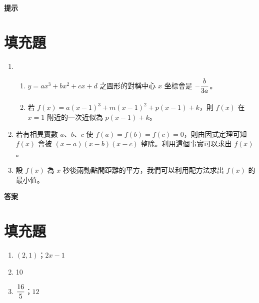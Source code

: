 \documentclass[10pt]{article}
\newcommand*{\fraction}[2]{\rule[-.8\baselineskip]{0pt}{2\baselineskip}\dfrac{#1}{#2}}
\begin{document}
\newpage
\label{hint}
{\bfseries\large 提示 \par}
\setcounter{section}{0}
\section{填充題}
\begin{enumerate}[label=\Alph*.,left=0pt]
  \item 
  \begin{enumerate}[label=(\arabic*),left=0pt]
    \item $y=ax^3 + bx^2 + cx + d$ 之圖形的對稱中心 $x$ 坐標會是 $-\fraction{b}{3a}$。
    \item 若 $f(x) = a(x-1)^3 + m(x-1)^2 + p(x-1) + k$，則 $f(x)$ 在 $x = 1$ 附近的一次近似為 $p(x - 1) + k$。
  \end{enumerate}
  \item 若有相異實數 $a$、$b$、$c$ 使 $f(a) = f(b) = f(c) = 0$，則由因式定理可知 $f(x)$ 會被 $(x-a)(x-b)(x-c)$ 整除。利用這個事實可以求出 $f(x)$。
  \item 設 $f(x)$ 為 $x$ 秒後兩動點間距離的平方，我們可以利用配方法求出 $f(x)$ 的最小值。
\end{enumerate}

\newpage
\label{answer}
{\bfseries\large 答案 \par}
\setcounter{section}{0}
\section{填充題}
\begin{enumerate}[label=\Alph*.,left=0pt]
  \item $(2,1)$；$2x-1$
  \item 10
  \item $\fraction{16}{5}$；$12$
\end{enumerate}
\end{document}
